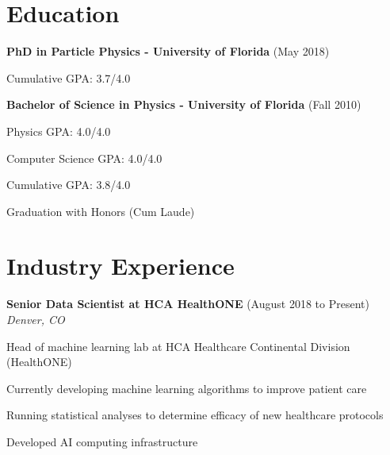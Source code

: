 \begin{resume}
\hspace{20 mm}

    \section{\mysidestyle Education}

    {\bf PhD in Particle Physics - University of Florida} (May 2018)\\\vspace{2mm}%
    \begin{stuff}
        \vspace{-5mm}
        \item Cumulative GPA: 3.7/4.0 
    \end{stuff}
    {\bf Bachelor of Science in Physics - University of Florida} (Fall 2010)\\\vspace{2mm}%
    \begin{stuff}
        \vspace{-5mm}
        \item Physics GPA: 4.0/4.0
        \item Computer Science GPA: 4.0/4.0
        \item Cumulative GPA: 3.8/4.0 
        \item Graduation with Honors (Cum Laude)
    \end{stuff}

    \section{\mysidestyle Industry Experience}
    
    {\bf Senior Data Scientist at HCA HealthONE} (August 2018 to Present)\\\vspace{2mm}%
    \textit{Denver, CO}
    \begin{stuff}
        \vspace*{1mm}
                \item Head of machine learning lab at HCA Healthcare Continental Division (HealthONE)
                \item Currently developing machine learning algorithms to improve patient care
                \item Running statistical analyses to determine efficacy of new healthcare protocols
                \item Developed AI computing infrastructure
    \end{stuff}


\end{resume}
